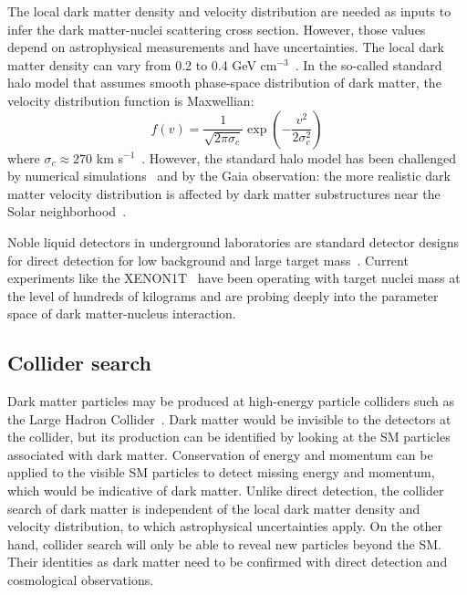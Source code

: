 \documentclass[doublespace,nopageskip]{VTthesis}
\begin{document}
The local dark matter density and velocity distribution are needed as inputs to infer the dark matter-nuclei scattering cross section. However, those values depend on astrophysical measurements and have uncertainties. The local dark matter density can vary from 0.2 to 0.4 GeV cm$^{-3}$~\cite{2010A&A...509A..25W}. In the so-called standard halo model that assumes smooth phase-space distribution of dark matter, the velocity distribution function is Maxwellian:
\begin{equation}
    f(v) = \frac{1}{\sqrt{2\pi \sigma_c}}\exp\left(-\frac{v^2}{2\sigma_c^2}\right)
\end{equation}
where $\sigma_c \approx 270$ km s$^{-1}$~\cite{2012PDU.....1...94B}. However, the standard halo model has been challenged {by numerical simulations~\cite{2013ApJ...764...35M} and }by the Gaia observation: the more realistic dark matter velocity distribution is affected by dark matter substructures near the Solar neighborhood~\cite{2019ApJ...874....3N}. 

Noble liquid detectors in underground laboratories are standard detector designs for direct detection for low background and large target mass~\cite{2012PDU.....1...94B}. Current experiments like the XENON1T~\cite{2019PhRvL.122g1301A} have been operating with target nuclei mass at the level of hundreds of kilograms and are probing deeply into the parameter space of dark matter-nucleus interaction.

\subsection{Collider search}

Dark matter particles may be produced at high-energy particle colliders such as the Large Hadron Collider~\cite{2013IJMPA..2830052M}. Dark matter would be invisible to the detectors at the collider, but its production can be identified by looking at the SM particles associated with dark matter. Conservation of energy and momentum can be applied to the visible SM particles to detect missing energy and momentum, which would be indicative of dark matter. Unlike direct detection, the collider search of dark matter is independent of the local dark matter density and velocity distribution, to which astrophysical uncertainties apply. {On the other hand, collider search will only be able to reveal new particles beyond the SM. Their identities as dark matter need to be confirmed with direct detection and cosmological observations.}
\end{document}
